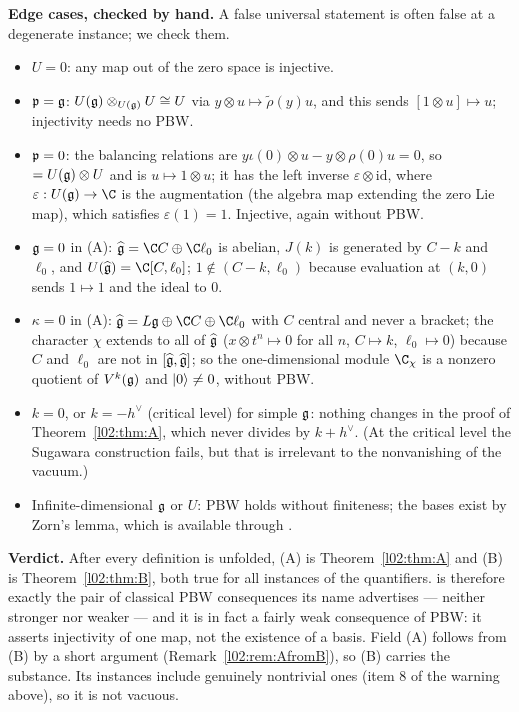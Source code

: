 \begin{dictionary}
\textbf{Edge cases, checked by hand.} A false universal statement is often false at a degenerate
instance; we check them.
\begin{itemize}
\item $U = 0$: any map out of the zero space is injective.
\item $\mathfrak{p} = \mathfrak{g}$: $U(\mathfrak{g})\otimes_{U(\mathfrak{g})}U\cong U$ via $y\otimes u\mapsto\tilde\rho(y)u$, and this
  sends $[1\otimes u]\mapsto u$; injectivity needs no PBW.
\item $\mathfrak{p} = 0$: the balancing relations are $y\iota(0)\otimes u - y\otimes\rho(0)u = 0$, so
   $=U(\mathfrak{g})\otimes U$ and  is $u\mapsto1\otimes u$; it has the left inverse
  $\varepsilon\otimes\mathrm{id}$, where $\varepsilon : U(\ltwog)\to\C$ is the augmentation (the algebra map
  extending the zero Lie map), which satisfies $\varepsilon(1) = 1$. Injective, again without PBW.
\item $\mathfrak{g} = 0$ in (A): $\ltwoghat = \C C\oplus\C\ell_0$ is abelian, $J(k)$ is generated by $C-k$ and
  $\ell_0$, and $U(\ltwoghat) = \C[C,\ell_0]$; $1\notin(C-k,\ell_0)$ because evaluation at $(k,0)$ sends
  $1\mapsto1$ and the ideal to $0$.
\item $\kappa = 0$ in (A): $\ltwoghat = L\ltwog\oplus\C C\oplus\C\ell_0$ with $C$ central and never a
  bracket; the character $\chi$ extends to all of $\widehat{\mathfrak{g}}$ ($x\otimes t^n\mapsto0$ for all $n$,
  $C\mapsto k$, $\ell_0\mapsto0$) because $C$ and $\ell_0$ are not in $[\widehat{\mathfrak{g}},\widehat{\mathfrak{g}}]$; so the
  one-dimensional module $\C_\chi$ is a nonzero quotient of $V^k(\mathfrak{g})$ and $|0\rangle\ne0$, without PBW.
\item $k = 0$, or $k = -h^\vee$ (critical level) for simple $\mathfrak{g}$: nothing changes in the proof of
  Theorem~\ref{l02:thm:A}, which never divides by $k+h^\vee$. (At the critical level the Sugawara
  construction fails, but that is irrelevant to the nonvanishing of the vacuum.)
\item Infinite-dimensional $\mathfrak{g}$ or $U$: PBW holds without finiteness; the bases exist by Zorn's lemma,
  which is available through .
\end{itemize}
\textbf{Verdict.} After every definition is unfolded, (A) is Theorem~\ref{l02:thm:A} and (B) is
Theorem~\ref{l02:thm:B}, both true for all instances of the quantifiers.  is therefore
exactly the pair of classical PBW consequences its name advertises --- neither stronger nor weaker --- and
it is in fact a fairly weak consequence of PBW: it asserts injectivity of one map, not the existence of a
basis. Field (A) follows from (B) by a short argument (Remark~\ref{l02:rem:AfromB}), so (B) carries the substance. Its
instances include genuinely nontrivial ones (item 8 of the warning above), so it is not vacuous.
\end{dictionary}

